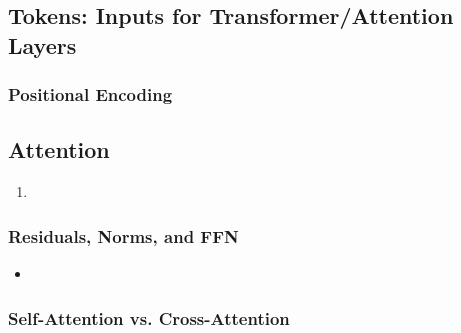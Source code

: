 \begin{motivation}

\end{motivation}

\subsection{Tokens: Inputs for Transformer/Attention Layers}
\begin{definition}
    
\end{definition}

\subsubsection{Positional Encoding}
\begin{definition}
    
\end{definition}

\subsection{Attention}
\begin{process}
    \begin{enumerate}
        \item 
    \end{enumerate}
\end{process}

\begin{notes}
    
\end{notes}

\subsubsection{Residuals, Norms, and FFN}
\begin{notes}
    \begin{itemize}
        \item 
    \end{itemize}
\end{notes}

\subsubsection{Self-Attention vs. Cross-Attention}
\begin{notes}
    
\end{notes}

